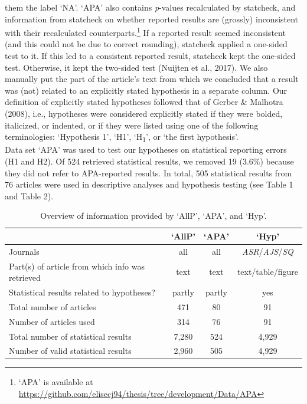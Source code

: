 \documentclass[
  12pt,
]{article}
\begin{document}
them the label `NA'. `APA' also contains \emph{p}-values recalculated by
statcheck, and information from statcheck on whether reported results
are (grossly) inconsistent with their recalculated
counterparts.\footnote{`APA' is available at
  \url{https://github.com/elisecj94/thesis/tree/development/Data/APA}}
If a reported result seemed inconsistent (and this could not be due to
correct rounding), statcheck applied a one-sided test to it. If this led
to a consistent reported result, statcheck kept the one-sided test.
Otherwise, it kept the two-sided test (Nuijten et al., 2017). We also
manually put the part of the article's text from which we concluded that
a result was (not) related to an explicitly stated hypothesis in a
separate column. Our definition of explicitly stated hypotheses followed
that of Gerber \& Malhotra (2008), i.e., hypotheses were considered
explicitly stated if they were bolded, italicized, or indented, or if
they were listed using one of the following terminologies: `Hypothesis
1', `H1', `H\textsubscript{1}', or `the first hypothesis'.\\
\hspace*{0.333em}\hspace*{0.333em}\hspace*{0.333em}\hspace*{0.333em}Data
set `APA' was used to test our hypotheses on statistical reporting
errors (H1 and H2). Of 524 retrieved statistical results, we removed 19
(3.6\%) because they did not refer to APA-reported results. In total,
505 statistical results from 76 articles were used in descriptive
analyses and hypothesis testing (see Table 1 and Table 2).\\

\begin{table}[H]

\caption{\label{tab:Table 1 overview information data sets}Overview of information provided by ‘AllP', ‘APA', and ‘Hyp'.}
\centering
\begin{tabular}[t]{lccc}
\toprule
  & ‘AllP’ & ‘APA’ & ‘Hyp’\\
\midrule
Journals & all & all & \emph{ASR}/\emph{AJS}/\emph{SQ}\\
Part(s) of article from which info was retrieved & text & text & text/table/figure\\
Statistical results related to hypotheses? & partly & partly & yes\\
Total number of articles & 471 & 80 & 91\\
Number of articles used & 314 & 76 & 91\\
\addlinespace
Total number of statistical results & 7,280 & 524 & 4,929\\
Number of valid statistical results & 2,960 & 505 & 4,929\\
\bottomrule
\end{tabular}
\end{table}
\end{document}
